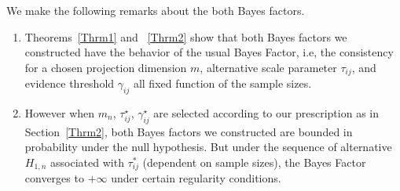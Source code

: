 \documentclass[times,sort&compress,3p]{elsarticle}
\theoremstyle{plain}%
\theoremstyle{definition}
\def\refhg{\hangindent=20pt\hangafter=1}
\def\refmark{\par\vskip 2mm\noindent\refhg}
\def\refhg{\hangindent=20pt\hangafter=1}
\def\refmark{\par\vskip 2mm\noindent\refhg}
\def\refhg{\hangindent=20pt\hangafter=1}
\def\refmark{\par\vskip 2mm\noindent\refhg}
\def\refhg{\hangindent=20pt\hangafter=1}
\def\refmark{\par\vskip 2mm\noindent\refhg}
\begin{document}
\refmark{\bf Remarks:}
We make the following remarks about the both Bayes factors. 
\begin{enumerate}
    \item Theorems~\ref{Thrm1} and ~\ref{Thrm2} show that both Bayes factors we constructed have the behavior of the usual Bayes Factor, i.e, the consistency for a chosen projection dimension $m$, alternative scale parameter $\tau_{ij}$, and evidence threshold $\gamma_{ij}$ all fixed function of the sample sizes. 
    \item However when $m_n$, $\tau^{\star}_{ij}$, $\gamma^{\star}_{ij}$ are selected according to our prescription as in Section~\ref{Thrm2}, both Bayes factors we constructed are bounded in probability under the null hypothesis. But under the sequence of alternative $H_{1,n}$ associated with $\tau^{*}_{ij}$ (dependent on sample sizes), the Bayes Factor converges to $+\infty$ under certain regularity conditions.
\end{enumerate}
\end{document}
